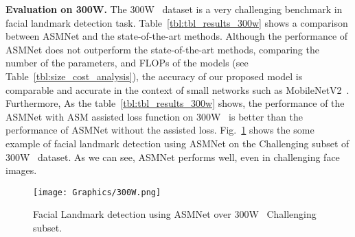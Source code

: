 \documentclass[final]{cvpr}
\begin{document}
\textbf{Evaluation on 300W.}
The 300W~\cite{sagonas2013300}  dataset is a very challenging benchmark in facial landmark detection task. Table~\ref{tbl:tbl_results_300w} shows a comparison between ASMNet and the state-of-the-art methods. Although the performance of ASMNet does not outperform the state-of-the-art methods, comparing the number of the parameters, and FLOPs of the models (see Table~\ref{tbl:size_cost_analysis}), the accuracy of our proposed model is comparable and accurate in the context of small networks such as MobileNetV2~\cite{sandler2018mobilenetv2}. Furthermore, As the table~\ref{tbl:tbl_results_300w} shows, the performance of the ASMNet with ASM assisted loss function on 300W~\cite{sagonas2013300} is better than the performance of ASMNet without the assisted loss. Fig.~\ref{fig:result_300w} shows the some example of facial landmark detection using ASMNet on the Challenging subset of 300W~\cite{sagonas2013300} dataset. As we can see, ASMNet performs well, even in challenging face images.

\begin{figure}[t]
  \centering
  \texttt{[image: Graphics/300W.png]}
  \caption{Facial Landmark detection using ASMNet over 300W~\cite{sagonas2013300} Challenging subset.}
  \label{fig:result_300w}
\end{figure}
\end{document}
